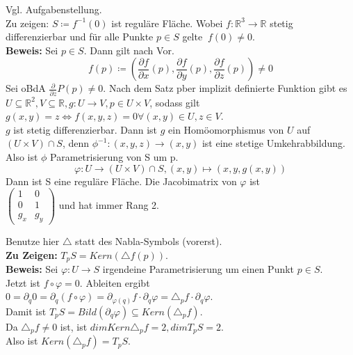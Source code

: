 \begin{problem*}[1a]
Vgl. Aufgabenstellung.\\
Zu zeigen: $S \coloneqq f^{ -1 }(0)$ ist reguläre Fläche. Wobei $f: \mathbb{R}^3 \to \mathbb{R}$ stetig differenzierbar und für alle Punkte $ p \in S $ gelte $\ f(0) \neq 0$.\\
\textbf{Beweis:} Sei $ p \in S $. Dann gilt nach Vor.
\begin{equation*}
  f(p) \coloneqq \left( \frac{\partial f}{\partial x}(p), 
                        \frac{\partial f}{\partial y}(p), 
                        \frac{\partial f}{\partial z}(p) \right) \neq 0
\end{equation*}
Sei oBdA $\frac{\partial}{\partial z} P(p) \neq 0$. Nach dem Satz pber implizit definierte Funktion gibt es
$U \subseteq \mathbb{R}^2, V \subseteq \mathbb{R}, g: U \to V, p \in U \times V$, sodass gilt 
$g(x,y) = z \Leftrightarrow f(x,y,z) = 0 \forall (x,y) \in U, z \in V$.\\
$ g $ ist stetig differenzierbar. Dann ist $ g $ ein Homöomorphismus von $ U $ auf $ (U \times V) \cap S$, denn $\phi^{ -1 }:(x,y,z) \to (x,y)$ ist eine stetige Umkehrabbildung.\\
Also ist $ \phi $ Parametrisierung von S um p.
\begin{equation*}
  \varphi: U \to (U \times V) \cap S, (x,y) \mapsto (x,y,g(x,y))
\end{equation*}
Dann ist S eine reguläre Fläche.
Die Jacobimatrix von $\varphi$ ist\\ 
$
\begin{pmatrix}
  1   &   0 \\
   0   &   1 \\
   g_x & g_y
\end{pmatrix}
$
und hat immer Rang 2.
\end{problem*}

\begin{problem*}[1b] Benutze hier $ \triangle $ statt des Nabla-Symbols (vorerst).\\
\textbf{Zu Zeigen:} $T_pS = Kern( \triangle f(p))$.\\
\textbf{Beweis:} Sei $ \varphi: U \to S $ irgendeine Parametrisierung um einen Punkt $ p \in S $.\\
Jetzt ist $f \circ \varphi = 0$. Ableiten ergibt\\
$ 0 = \partial_q 0 = \partial_q (f \circ \varphi) = \partial_{ \varphi(q) }f \cdot \partial_q \varphi = \triangle_p f \cdot \partial_q \varphi$.\\
Damit ist $T_pS = Bild(\partial_q \varphi) \subseteq Kern(\triangle_p f)$. \\
Da $\triangle_p f \neq 0$ ist, ist $dim Kern \triangle_p f = 2, dim T_pS = 2$. \\
Also ist $ Kern (\triangle_p f) = T_pS$.

\end{problem*}

